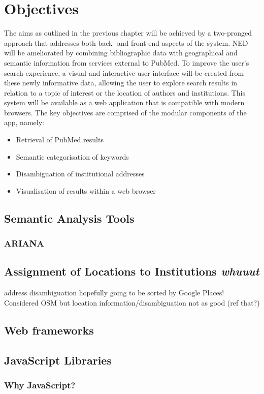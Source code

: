\documentclass[PROP_AGutteridge_CS.tex]{subfiles}
\begin{document}
\chapter{Objectives}
The aims as outlined in the previous chapter will be achieved by a two-pronged approach that addresses both back- and front-end aspects of the system. NED will be ameliorated by combining bibliographic data with geographical and semantic information from services external to PubMed. To improve the user's search experience, a visual and interactive user interface will be created from these newly informative data, allowing the user to explore search results in relation to a topic of interest or the location of authors and institutions. This system will be available as a web application that is compatible with modern browsers. The key objectives are comprised of the modular components of the app, namely:
\begin{itemize}
\item{Retrieval of PubMed results}
\item{Semantic categorisation of keywords}
\item{Disambiguation of institutional addresses}
\item{Visualisation of results within a web browser}
\end{itemize}

\section{Semantic Analysis Tools} 
\subsection{ARIANA}

\section{Assignment of Locations to Institutions \emph{whuuut}}
address disambiguation hopefully going to be sorted by Google Places! Considered OSM but location information/disambiguation not as good (ref that?)

\section{Web frameworks}

\section{JavaScript Libraries}
\subsection{Why JavaScript?} 
   
 
\end{document}
